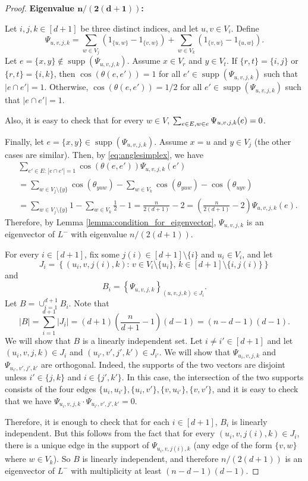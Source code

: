\documentclass[a4paper,11pt]{article}
\theoremstyle{plain}
\theoremstyle{definition}
\DeclareMathOperator{\supp}{\text{supp}}
\begin{document}
\begin{proof}
\textbf{Eigenvalue $\bm{n/(2(d+1))}$:} 

Let $i,j,k\in[d+1]$ be three distinct 
indices, and let $u,v\in V_i$. Define
\[
    \Psi_{u,v,j,k}= \sum_{w\in V_j} (1_{\{u,w\}}-1_{\{v,w\}})+\sum_{w\in V_k} (1_{\{v,w\}}-1_{\{u,w\}}).
\]
Let $e=\{x,y\}\notin \supp(\Psi_{u,v,j,k})$. Assume $x\in V_r$ and $y\in V_t$. If $\{r,t\}=\{i,j\}$ or $\{r,t\}=\{i,k\}$, then $\cos(\theta(e,e'))=1$ for all $e'\in \supp(\Psi_{u,v,j,k})$ such that $|e\cap e'|=1$. Otherwise, $\cos(\theta(e,e'))=1/2$ for all $e'\in \supp(\Psi_{u,v,j,k})$  such that $|e\cap e'|=1$.

Also, it is easy to check that for every $w\in V$, $\sum_{e\in E,\\ w\in e} \Psi_{u,v,j,k}(e)=0$.

Finally, let $e=\{x,y\}\in\supp(\Psi_{u,v,j,k})$. Assume $x=u$ and $y\in V_j$ (the other cases are similar). Then, by \eqref{eq:anglesimplex}, we have
\begin{align*}
        &\sum_{e'\in E:\, |e\cap e'|=1} \cos(\theta(e,e'))\Psi_{u,v,j,k}(e')
        \\&=\sum_{w\in V_j\setminus\{y\}} \cos(\theta_{y u w}) - \sum_{w\in V_k}\cos(\theta_{y u w}) - \cos(\theta_{u y v})
        \\
        &=\sum_{w\in V_j\setminus\{y\}} 1  -\sum_{w\in V_k} \frac{1}{2} -1 = \frac{n}{2(d+1)}-2=\left(\frac{n}{2(d+1)}-2\right)\Psi_{u,v,j,k}(e).
        \end{align*}
Therefore, by Lemma \ref{lemma:condition_for_eigenvector}, $\Psi_{u,v,j,k}$ is an eigenvector of $L^{-}$ with eigenvalue $n/(2(d+1))$.


For every $i\in[d+1]$, fix some $j(i)\in [d+1]\setminus\{i\}$ and $u_i\in V_i$, and let
\[
    J_i=\left\{(u_i,v,j(i),k):\, v\in V_i\setminus\{u_i\}, \, k\in[d+1]\setminus\{i,j(i)\}\right\}
\]
and
\[
    B_i= \left\{ \Psi_{u,v,j,k}\right\}_{(u,v,j,k)\in J_i}.
\]
Let $B=\cup_{i=1}^{d+1} B_i$. Note that
\[
    |B|=\sum_{i=1}^{d+1}|J_i|= (d+1)\left(\frac{n}{d+1}-1\right)(d-1)  =    (n-d-1)(d-1).
\]
We will show that $B$ is a linearly independent set. Let $i\neq i'\in[d+1]$ and let $(u_i,v,j,k)\in J_i$ and $(u_{i'},v',j',k')\in J_{i'}$. We will show that $\Psi_{u_i,v,j,k}$ and $\Psi_{u_{i'},v',j',k'}$ are orthogonal. Indeed, the supports of the two vectors are disjoint unless $i'\in \{j,k\}$ and $i\in \{j',k'\}$. In this case, the intersection of the two supports consists of the four edges $\{u_i,u_{i'}\},\{u_i,v'\},\{v,u_{i'}\},\{v,v'\}$, and it is easy to check that 
we have $\Psi_{u_i,v,j,k}\cdot\Psi_{u_{i'},v',j',k'}=0$.

Therefore, it is enough to check that for each $i\in[d+1]$, $B_i$ is linearly independent. But this follows from the fact that for every $(u_i,v,j(i),k)\in J_i$, there is a unique edge in the support of $\Psi_{u_i,v,j(i),k}$ (any edge of the form $\{v,w\}$ where $w\in V_k$). So $B$ is linearly independent, and therefore $n/(2(d+1))$ is an eigenvector of $L^{-}$ with multiplicity at least $(n-d-1)(d-1)$. 
\end{proof}
\end{document}
